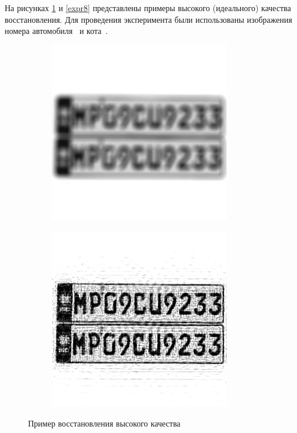 %

На рисунках \ref{expr7} и \ref{expr8} представлены примеры высокого (идеального) качества восстановления. Для проведения эксперимента были использованы изображения номера автомобиля~\cite{car} и кота~\cite{cat}.

\begin{figure}[!h]
	\centering
	\begin{subfigure}{.5\textwidth}
		\centering
		\includegraphics[scale=0.65]{assets/car_perfect}
	\end{subfigure}%
	\begin{subfigure}{.5\textwidth}
		\centering
		\includegraphics[scale=0.85]{assets/car_perfect_result}
	\end{subfigure}
	\caption{Пример восстановления высокого качества}
	\label{expr7}
\end{figure}

